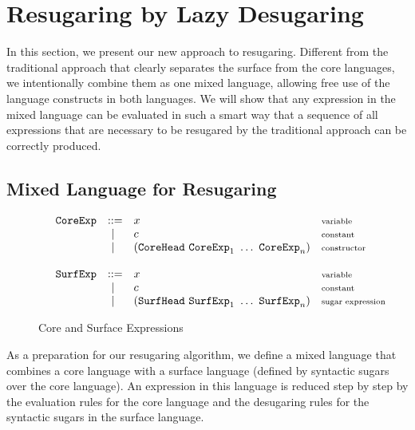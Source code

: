 
\section{Resugaring by Lazy Desugaring}
\label{sec3}

In this section, we present our new approach to resugaring. Different from the traditional approach that clearly separates the surface from the core languages, we intentionally combine them as one mixed language, allowing free use of the language constructs in both languages. We will show that any expression in the mixed language can be evaluated in such a smart way that a sequence of all expressions that are necessary to be resugared by the traditional approach can be correctly produced.

\subsection{Mixed Language for Resugaring}

\begin{figure}[t]
{\footnotesize
\[
	\begin{array}{lllll}
	 &\mbox{\tt CoreExp} &::=& x  & \mbox{{\scriptsize variable}}\\
	       &&~|~& c  & \mbox{{\scriptsize constant}}\\
				 &&~|~& (\mbox{\tt CoreHead}~\mbox{\tt CoreExp}_1~\ldots~\mbox{\tt CoreExp}_n) & \mbox{{\scriptsize constructor}}\\
	\\
	 &\mbox{\tt SurfExp} &::=& x  & \mbox{{\scriptsize variable}}\\
	       &&~|~& c  & \mbox{{\scriptsize constant}}\\
					 &&~|~& (\mbox{\tt SurfHead}~\mbox{\tt SurfExp}_1~\ldots~\mbox{\tt SurfExp}_n) & \mbox{{\scriptsize sugar expression}}\\
	\end{array}
	\]
}

	\caption{Core and Surface Expressions}
	\label{fig:expression}
\end{figure}

As a preparation for our resugaring algorithm, we define a mixed language that combines a core language with a surface language (defined by syntactic sugars over the core language). An expression in this language is reduced step by step by the evaluation rules for the core language and the desugaring rules for the syntactic sugars in the surface language.

